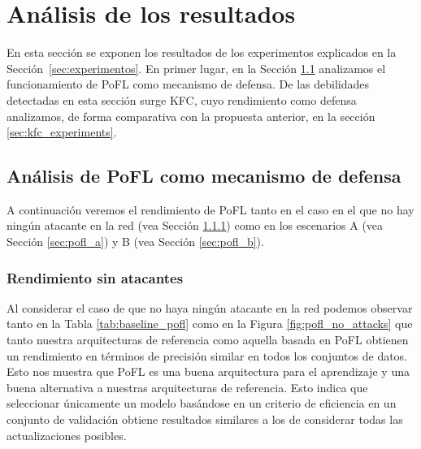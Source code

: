 \chapter{Análisis de los resultados}\label{sec:resultados}

En esta sección se exponen los resultados de los experimentos explicados en la Sección~\ref{sec:experimentos}. En primer lugar, en la Sección \ref{sec:hipotesis} analizamos el funcionamiento de \ac{PoFL} como mecanismo de defensa. De las debilidades detectadas en esta sección surge \ac{KFC}, cuyo rendimiento como defensa analizamos, de forma comparativa con la propuesta anterior, en la sección \ref{sec:kfc_experiments}. 

\section{Análisis de PoFL como mecanismo de defensa}\label{sec:hipotesis}

A continuación veremos el rendimiento de \ac{PoFL} tanto en el caso en el que no hay ningún atacante en la red (vea Sección \ref{sec:sin_attack_pofl}) como en los escenarios A (vea Sección \ref{sec:pofl_a}) y B (vea Sección \ref{sec:pofl_b}).

\subsection{Rendimiento sin atacantes}\label{sec:sin_attack_pofl}
Al considerar el caso de que no haya ningún atacante en la red podemos observar tanto en la Tabla \ref{tab:baseline_pofl} como en la Figura \ref{fig:pofl_no_attacks} que tanto nuestra arquitecturas de referencia como aquella basada en \ac{PoFL} obtienen un rendimiento en términos de precisión
similar en todos los conjuntos de datos. Esto nos muestra que \ac{PoFL} es una buena arquitectura para el aprendizaje y una buena alternativa a nuestras arquitecturas de referencia. Esto indica que seleccionar únicamente un modelo basándose en un criterio de eficiencia en un conjunto de validación obtiene resultados similares a los de considerar todas las actualizaciones posibles.

